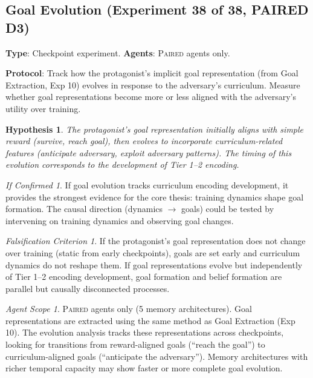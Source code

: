 \documentclass[11pt,a4paper]{article}
\newtheorem{hypothesis}{Hypothesis}[subsection]
\theoremstyle{remark}
\newtheorem*{falsification}{Falsification Criterion}
\newtheorem*{implication}{If Confirmed}
\newtheorem*{agentscope}{Agent Scope}
\newcommand{\paired}{\textsc{Paired}}
\begin{document}
\subsection{Goal Evolution (Experiment 38 of 38, PAIRED D3)}
\label{exp:goal_evolution}

\textbf{Type}: Checkpoint experiment. \textbf{Agents}: \paired{} agents only.

\textbf{Protocol}: Track how the protagonist's implicit goal representation (from Goal Extraction, Exp 10) evolves in response to the adversary's curriculum. Measure whether goal representations become more or less aligned with the adversary's utility over training.

\begin{hypothesis}
The protagonist's goal representation initially aligns with simple reward (survive, reach goal), then evolves to incorporate curriculum-related features (anticipate adversary, exploit adversary patterns). The timing of this evolution corresponds to the development of Tier 1--2 encoding.
\end{hypothesis}

\begin{implication}
If goal evolution tracks curriculum encoding development, it provides the strongest evidence for the core thesis: training dynamics shape goal formation. The causal direction (dynamics $\to$ goals) could be tested by intervening on training dynamics and observing goal changes.
\end{implication}

\begin{falsification}
If the protagonist's goal representation does not change over training (static from early checkpoints), goals are set early and curriculum dynamics do not reshape them. If goal representations evolve but independently of Tier 1--2 encoding development, goal formation and belief formation are parallel but causally disconnected processes.
\end{falsification}

\begin{agentscope}
\paired{} agents only (5 memory architectures). Goal representations are extracted using the same method as Goal Extraction (Exp 10). The evolution analysis tracks these representations across checkpoints, looking for transitions from reward-aligned goals (``reach the goal'') to curriculum-aligned goals (``anticipate the adversary''). Memory architectures with richer temporal capacity may show faster or more complete goal evolution.
\end{agentscope}
\end{document}
